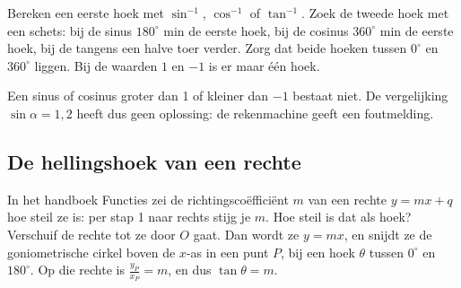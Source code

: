 
\begin{werkwijze}
Bereken een eerste hoek met $\sin^{-1}$, $\cos^{-1}$ of $\tan^{-1}$. Zoek de tweede hoek met een schets: bij de sinus $180^\circ$ min de eerste hoek, bij de cosinus $360^\circ$ min de eerste hoek, bij de tangens een halve toer verder. Zorg dat beide hoeken tussen $0^\circ$ en $360^\circ$ liggen. Bij de waarden $1$ en $-1$ is er maar één hoek.
\end{werkwijze}


Een sinus of cosinus groter dan 1 of kleiner dan $-1$ bestaat niet. De vergelijking $\sin\alpha = 1{,}2$ heeft dus geen oplossing: de rekenmachine geeft een foutmelding.

\begin{oefeningen}
\end{oefeningen}

\subsection{De hellingshoek van een rechte}

In het handboek Functies zei de richtingscoëfficiënt $m$ van een rechte $y = mx + q$ hoe steil ze is: per stap 1 naar rechts stijg je $m$. Hoe steil is dat als hoek? Verschuif de rechte tot ze door $O$ gaat. Dan wordt ze $y = mx$, en snijdt ze de goniometrische cirkel boven de $x$-as in een punt $P$, bij een hoek $\theta$ tussen $0^\circ$ en $180^\circ$. Op die rechte is $\frac{y_P}{x_P} = m$, en dus $\tan\theta = m$.

